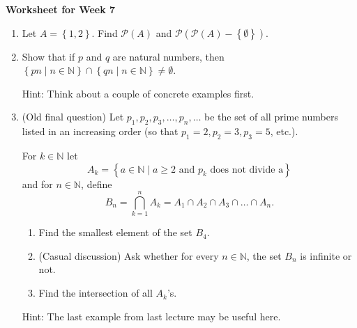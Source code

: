 \documentclass[12pt]{article}
\newcommand{\set}[1]{\left\{ #1 \right\}}
\begin{document}
\centerline{\bf\large Worksheet for Week 7}

\vspace{25pt}


\begin{enumerate}

\item Let $A=\set{1,2}$. Find $\mathcal P(A)$ and $\mathcal P(\mathcal P(A)-\set{\emptyset})$.

\item Show that if $p$ and $q$ are natural numbers, then $\set{pn \mid n \in\mathbb N}\cap\set{qn \mid n \in\mathbb N}\neq \emptyset$.

Hint: Think about a couple of concrete examples first.

\item (Old final question) Let $p_1, p_2, p_3, \ldots, p_n, \ldots$ be the set of all prime numbers listed in an increasing order (so that $p_1=2, p_2=3, p_3=5$, etc.).

For $k\in\mathbb N$ let
\[A_k=\set{a\in\mathbb N\mid a\geq 2 \text{ and $p_k$ does not divide a}}\]
and for $n\in\mathbb N$, define
\[B_n=\bigcap\limits_{k=1}^nA_k=A_1\cap A_2\cap A_3\cap\ldots \cap A_n.\]

\begin{enumerate}

\item Find the smallest element of the set $B_4$.

\item (Casual discussion) Ask whether for every $n\in\mathbb N$, the set $B_n$ is infinite or not.

\item Find the intersection of all $A_k$'s.

\end{enumerate}

Hint: The last example from last lecture may be useful here.


\end{enumerate}
\end{document}
